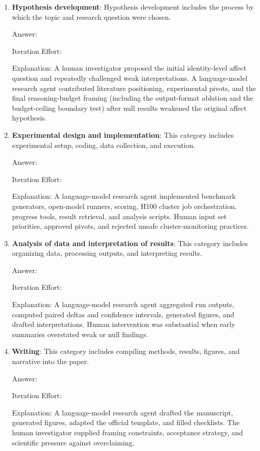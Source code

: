 \documentclass{article}
\begin{document}
\begin{enumerate}
    \item \textbf{Hypothesis development}: Hypothesis development includes the process by which the topic and research question were chosen.

    Answer: \involvementC{}

    Iteration Effort: \iterationHigh{}

    Explanation: A human investigator proposed the initial identity-level affect question and repeatedly challenged weak interpretations. A language-model research agent contributed literature positioning, experimental pivots, and the final reasoning-budget framing (including the output-format ablation and the budget-ceiling boundary test) after null results weakened the original affect hypothesis.

    \item \textbf{Experimental design and implementation}: This category includes experimental setup, coding, data collection, and execution.

    Answer: \involvementC{}

    Iteration Effort: \iterationHigh{}

    Explanation: A language-model research agent implemented benchmark generators, open-model runners, scoring, H100 cluster job orchestration, progress tools, result retrieval, and analysis scripts. Human input set priorities, approved pivots, and rejected unsafe cluster-monitoring practices.

    \item \textbf{Analysis of data and interpretation of results}: This category includes organizing data, processing outputs, and interpreting results.

    Answer: \involvementC{}

    Iteration Effort: \iterationHigh{}

    Explanation: A language-model research agent aggregated run outputs, computed paired deltas and confidence intervals, generated figures, and drafted interpretations. Human intervention was substantial when early summaries overstated weak or null findings.

    \item \textbf{Writing}: This category includes compiling methods, results, figures, and narrative into the paper.

    Answer: \involvementC{}

    Iteration Effort: \iterationHigh{}

    Explanation: A language-model research agent drafted the manuscript, generated figures, adapted the official template, and filled checklists. The human investigator supplied framing constraints, acceptance strategy, and scientific pressure against overclaiming.
\end{enumerate}
\end{document}
